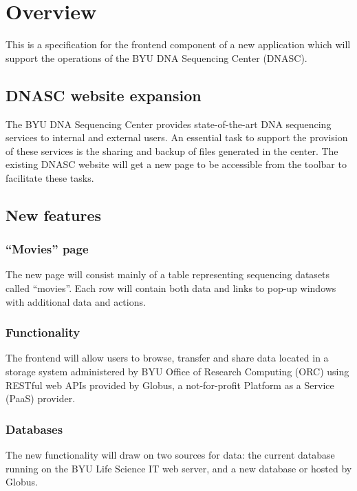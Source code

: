 
\section{Overview}

This is a specification for the frontend component of a new application which will
support the operations of the BYU DNA Sequencing Center (DNASC).

\subsection{DNASC website expansion}

The BYU DNA Sequencing Center provides state-of-the-art DNA sequencing services 
to internal and external users. An essential task to support the provision of these 
services is the sharing and backup of files generated in the center. The existing DNASC 
website  will get a new page to be accessible from the 
toolbar to facilitate these tasks.

\subsection{New features}

\subsubsection{``Movies'' page}
The new page will consist mainly of a table representing sequencing datasets called 
``movies''. Each row will contain both data and links to pop-up windows with additional 
data and actions. 

\subsubsection{Functionality}
The frontend will allow users to browse, transfer and share data 
located in a storage system administered by BYU Office of Research Computing (ORC) using
RESTful web APIs provided by Globus, a not-for-profit Platform as a Service (PaaS) provider.

\subsubsection{Databases}
The new functionality will draw on two sources for data: 
the current database running on the BYU Life Science IT web server, and a new database 
or  hosted by Globus.

